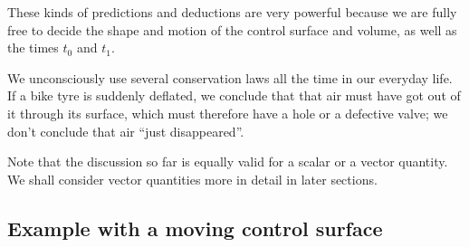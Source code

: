 \documentclass[a4paper,12pt,%
onecolumn,oneside,%
british%
]{memoir}
\newcommand{\mynotew}[1]{{\footnotesize\color{midgrey}\faIcon{tools}\ #1}}
\renewcommand*{\|}[1][]{\nonscript\:#1\vert\nonscript\:\mathopen{}}
\newcommand*{\yti}{t_{0}}
\newcommand*{\ytf}{t_{1}}
\newcommand*{\yN}{N}
\newcommand*{\yJ}{J}
\begin{document}
These kinds of predictions and deductions are very powerful because we are fully free to decide the shape and motion of the control surface and volume, as well as the times $\yti$ and $\ytf$.

We unconsciously use several conservation laws all the time in our everyday life. If a bike tyre is suddenly deflated, we conclude that that air must have got out of it through its surface, which must therefore have a hole or a defective valve; we don't conclude that air \enquote{just disappeared}.



\medskip

Note that the discussion so far is equally valid for a scalar or a vector quantity. We shall consider vector quantities more in detail in later sections.


\subsection{Example with a moving control surface}
\label{sec:example_conservation_moving}
\end{document}
